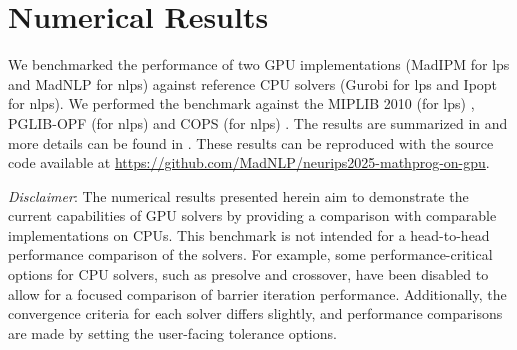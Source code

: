 \documentclass{article}
\begin{document}
\section{Numerical Results}\label{eqn:num}
We benchmarked the performance of two GPU implementations (MadIPM for \glspl*{lp} and MadNLP for \glspl*{nlp}) against reference CPU solvers (Gurobi for \glspl*{lp} and Ipopt for \glspl*{nlp}). 
We performed the benchmark against the MIPLIB 2010 (for \glspl*{lp}) \cite{kochMIPLIB20102011}, PGLIB-OPF (for \glspl*{nlp}) \cite{babaeinejadsarookolaeePowerGridLibrary2021} and COPS (for \glspl*{nlp}) \cite{dolanBenchmarkingOptimizationSoftware2001}.
The results are summarized in  and more details can be found in .
These results can be reproduced with the source code available at \url{https://github.com/MadNLP/neurips2025-mathprog-on-gpu}.


\textit{Disclaimer}: The numerical results presented herein aim to demonstrate the current capabilities of GPU solvers by providing a comparison with comparable implementations on CPUs. This benchmark is not intended for a head-to-head performance comparison of the solvers. For example, some performance-critical options for CPU solvers, such as presolve and crossover, have been disabled to allow for a focused comparison of barrier iteration performance. Additionally, the convergence criteria for each solver differs slightly, and performance comparisons are made by setting the user-facing tolerance options.

\begin{table}
  \footnotesize
  
  \caption{Solution times for CPU solvers (Gurobi and Ipopt) and GPU solvers (MadIPM and MadNLP) are represented using SGM10, defined as $(\prod_{i=1}^n (t_i +10))^{1/n} - 10$, where $t_i$ denotes the solve time for the $i$-th instance (in seconds; unsolved instances are assigned a maximum wall time of 900 seconds) across various datasets: MIPLIB (88 small, 58 medium, and 28 large \glspl*{lp}), PGLIB-OPF (31 small, 24 medium, and 11 large \glspl*{nlp}), and COPS (13 small, 16 medium, and 16 large \glspl*{nlp}). For Gurobi, the Barrier method is used, with both the Presolve and Crossover options disabled. MadNLP is configured with cuDSS, while Ipopt is configured with either Ma27 (for PGLIB-OPF) or Ma57 (for COPS). All \glspl*{nlp} are modeled using ExaModels, which supports \gls*{nlp} function evaluation on both CPU and GPU. The benchmarking was conducted on a workstation equipped with two Intel Xeon Gold 6130 CPUs, two Quadro GV~100 GPUs, and 128 GB of memory.
  }
  \label{tab:results}
\end{table}
\end{document}
